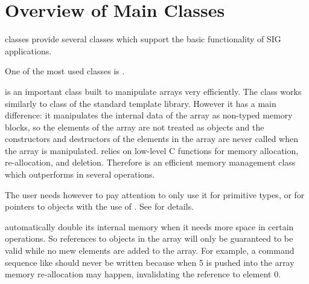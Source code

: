 \section{Overview of Main Classes}

 classes provide several classes which support the basic functionality of SIG applications. 

One of the most used classes is .

 is an important class built to manipulate arrays very efficiently. The class works similarly to  class of the standard template library. However it has a main difference: it manipulates the internal data of the array as non-typed memory blocks, so the elements of the array are not treated as objects and the constructors and destructors of the elements in the array are never called when the array is manipulated.  relies on low-level C functions for memory allocation, re-allocation, and deletion. Therefore  is an efficient memory management class which outperforms  in several operations. 

The user needs however to pay attention to only use it for primitive types, or for pointers to objects with the use of . See  for details.

 automatically double its internal memory when it needs more space in certain operations. So references to objects in the array will only be guaranteed to be valid while no mew elements are added to the array. For example, a command sequence like  should never be written because when 5 is pushed into the array memory re-allocation may happen, invalidating the reference to element 0.
